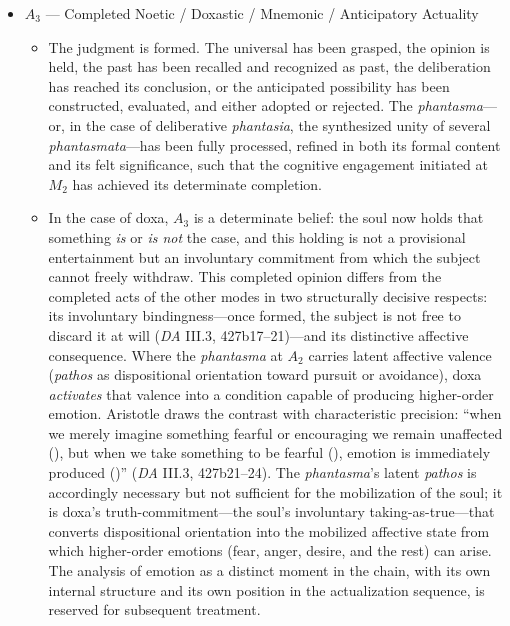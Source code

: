   \begin{itemize}
      \item $A_3$ --- Completed Noetic / Doxastic / Mnemonic / Anticipatory Actuality
      \begin{itemize}
          \item The judgment is formed. The universal has been grasped, the opinion
          is held, the past has been recalled and recognized as past, the
          deliberation has reached its conclusion, or the anticipated possibility
          has been constructed, evaluated, and either adopted or rejected. The
          \textit{phantasma}---or, in the case of deliberative \textit{phantasia},
          the synthesized unity of several \textit{phantasmata}---has been fully
          processed, refined in both its formal content and its felt significance,
          such that the cognitive engagement initiated at $M_2$ has achieved its
          determinate completion.

          \item In the case of doxa, $A_3$ is a determinate belief: the soul now
          holds that something \textit{is} or \textit{is not} the case, and this
          holding is not a provisional entertainment but an involuntary commitment
          from which the subject cannot freely withdraw. This completed opinion
          differs from the completed acts of the other modes in two structurally
          decisive respects: its involuntary bindingness---once formed, the subject
          is not free to discard it at will (\textit{DA} III.3, 427b17--21)---and
          its distinctive affective consequence. Where the \textit{phantasma} at
          $A_2$ carries latent affective valence (\textit{pathos} as dispositional
          orientation toward pursuit or avoidance), doxa \textit{activates} that
          valence into a condition capable of producing higher-order emotion.
          Aristotle draws the contrast with characteristic precision: ``when we merely
          imagine something fearful or encouraging we remain unaffected
          (), but when we take something to be fearful
          (), emotion is immediately produced
          ()'' (\textit{DA} III.3, 427b21--24). The
          \textit{phantasma}'s latent \textit{pathos} is accordingly necessary but
          not sufficient for the mobilization of the soul; it is doxa's
          truth-commitment---the soul's involuntary taking-as-true---that converts
          dispositional orientation into the mobilized affective state from which
          higher-order emotions (fear, anger, desire, and the rest) can arise. The
          analysis of emotion as a distinct moment in the chain, with its own
          internal structure and its own position in the actualization sequence, is
          reserved for subsequent treatment.


\end{itemize}
\end{itemize}
